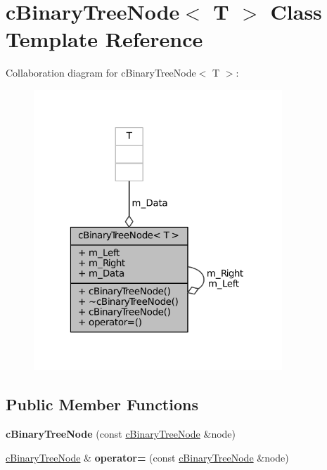 \hypertarget{classcBinaryTreeNode}{\section{c\-Binary\-Tree\-Node$<$ \-T $>$ \-Class \-Template \-Reference}
\label{classcBinaryTreeNode}
}


\-Collaboration diagram for c\-Binary\-Tree\-Node$<$ \-T $>$\-:\nopagebreak
\begin{figure}[H]
\begin{center}
\leavevmode
\includegraphics[width=265pt]{classcBinaryTreeNode__coll__graph}
\end{center}
\end{figure}
\subsection*{\-Public \-Member \-Functions}
\begin{DoxyCompactItemize}
\item 
\hypertarget{classcBinaryTreeNode_adc269d0d538836cb899bd54efbb366ca}{{\bfseries c\-Binary\-Tree\-Node} (const \hyperlink{classcBinaryTreeNode}{c\-Binary\-Tree\-Node} \&node)}\label{classcBinaryTreeNode_adc269d0d538836cb899bd54efbb366ca}

\item 
\hypertarget{classcBinaryTreeNode_a6acbedf8573060c303a93aba3af33350}{\hyperlink{classcBinaryTreeNode}{c\-Binary\-Tree\-Node} \& {\bfseries operator=} (const \hyperlink{classcBinaryTreeNode}{c\-Binary\-Tree\-Node} \&node)}\label{classcBinaryTreeNode_a6acbedf8573060c303a93aba3af33350}

\end{DoxyCompactItemize}
